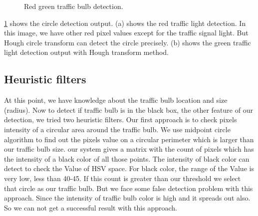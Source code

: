 \begin{figure}[!ht]
\centering
{}

\caption{Red green traffic bulb detection.}
\label{f:cir_img}
\end{figure}

\ref{f:cir_img} shows the circle detection output.
(a) shows the red traffic light detection.
In this image, we have other red pixel values except for the traffic signal light.
But Hough circle transform can detect the circle precisely.
(b) shows the green traffic light detection output with Hough transform method.

\subsection{Heuristic filters}
\label{s:filter}
At this point, we have knowledge about the traffic bulb location and size (radius).
Now to detect if traffic bulb is in the black box, the other feature of our detection, we tried two heuristic filters.
Our first approach is to check pixels intensity of a circular area around the traffic bulb.
We use midpoint circle algorithm to find out the pixels value on a circular perimeter which is larger than our traffic bulb size.
our system gives a matrix with the count of pixels which has the intensity of a black color of all those points.
The intensity of black color can detect to check the Value of HSV space.
For black color, the range of the Value is very low, less than 40-45.
If this count is greater than our threshold we select that circle as our traffic bulb.
But we face some false detection problem with this approach.
Since the intensity of traffic bulb color is high and it spreads out also.
So we can not get a successful result with this approach.

